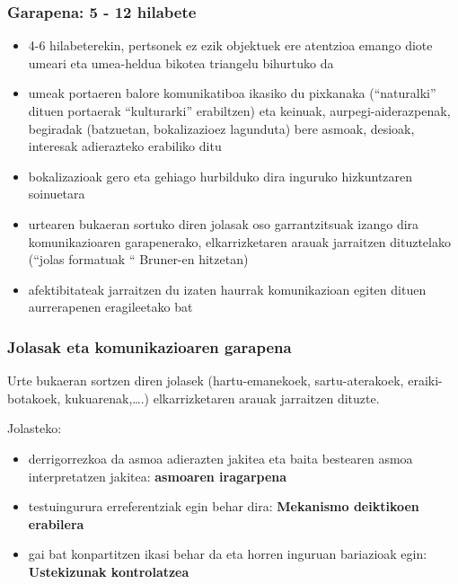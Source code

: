 \documentclass[
]{book}
\providecommand{\tightlist}{%
  \setlength{\itemsep}{0pt}\setlength{\parskip}{0pt}}
\begin{document}
\hypertarget{garapena-5---12-hilabete}{%
\subsubsection{Garapena: 5 - 12 hilabete}\label{garapena-5---12-hilabete}}

\begin{itemize}
\tightlist
\item
  4-6 hilabeterekin, pertsonek ez ezik objektuek ere atentzioa emango diote umeari eta umea-heldua bikotea triangelu bihurtuko da\\
\item
  umeak portaeren balore komunikatiboa ikasiko du pixkanaka (``naturalki'' dituen portaerak ``kulturarki'' erabiltzen) eta keinuak, aurpegi-aiderazpenak, begiradak (batzuetan, bokalizazioez lagunduta) bere asmoak, desioak, interesak adierazteko erabiliko ditu
\item
  bokalizazioak gero eta gehiago hurbilduko dira inguruko hizkuntzaren soinuetara\\
\item
  urtearen bukaeran sortuko diren jolasak oso garrantzitsuak izango dira komunikazioaren garapenerako, elkarrizketaren arauak jarraitzen dituztelako (``jolas formatuak `` Bruner-en hitzetan)\\
\item
  afektibitateak jarraitzen du izaten haurrak komunikazioan egiten dituen aurrerapenen eragileetako bat
\end{itemize}

\hypertarget{jolasak-eta-komunikazioaren-garapena}{%
\subsubsection{Jolasak eta komunikazioaren garapena}\label{jolasak-eta-komunikazioaren-garapena}}

Urte bukaeran sortzen diren jolasek (hartu-emanekoek, sartu-aterakoek, eraiki-botakoek, kukuarenak,\ldots.) elkarrizketaren arauak jarraitzen dituzte.

Jolasteko:

\begin{itemize}
\tightlist
\item
  derrigorrezkoa da asmoa adierazten jakitea eta baita bestearen asmoa interpretatzen jakitea: \textbf{asmoaren iragarpena}
\item
  testuingurura erreferentziak egin behar dira: \textbf{Mekanismo deiktikoen erabilera}
\item
  gai bat konpartitzen ikasi behar da eta horren inguruan bariazioak egin: \textbf{Ustekizunak kontrolatzea}
\end{itemize}
\end{document}
